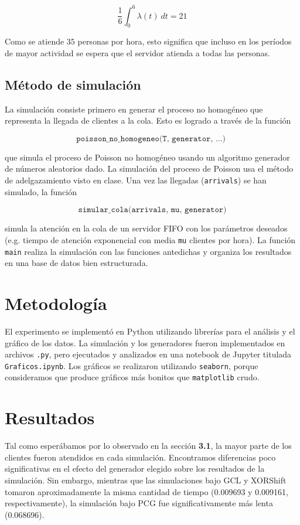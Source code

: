 \documentclass[a4paper, 12pt]{article}
\begin{document}
\begin{equation}
    \frac{1}{6}\int_0^{6}\lambda(t) ~ dt = 21
\end{equation}

Como se atiende $35$ personas por hora, esto significa que incluso en los
períodos de mayor actividad se espera que el servidor atienda a todas las
personas.

\subsection{Método de simulación}

La simulación consiste primero en generar el proceso no homogéneo que representa
la llegada de clientes a la cola. Esto es logrado a través de la función 

\begin{equation*}
    \texttt{poisson\_no\_homogeneo(T, generator, ...) }
\end{equation*}

que simula el proceso de Poisson no homogéneo usando un algoritmo generador de
números aleatorios dado. La simulación del proceso de Poisson usa el método de
adelgazamiento visto en clase. Una vez las llegadas (\texttt{arrivals}) se han simulado, la función

\begin{equation*}
\texttt{simular\_cola(arrivals, mu, generator)}
\end{equation*}

simula la atención en la cola de un servidor FIFO con los parámetros deseados
(e.g. tiempo de atención exponencial con media \texttt{mu} clientes por hora). La función \texttt{main}
realiza la simulación con las funciones antedichas y organiza los resultados en
una base de datos bien estructurada.


\section{Metodología}

El experimento se implementó en Python utilizando librerías para el análisis y
el gráfico de los datos. La simulación y los generadores fueron implementados en
archivos \texttt{.py}, pero ejecutados y analizados en una notebook de Jupyter
titulada \texttt{Graficos.ipynb}. Los gráficos se realizaron utilizando
\texttt{seaborn}, porque consideramos que produce gráficos más bonitos que
\texttt{matplotlib} crudo. 

\section{Resultados}

Tal como esperábamos por lo observado en la sección \textbf{3.1}, la mayor parte
de los clientes fueron atendidos en cada simulación. Encontramos diferencias
poco significativas en el efecto del generador elegido sobre los resultados de
la simulación. Sin embargo, mientras que las simulaciones bajo GCL y XORShift
tomaron aproximadamente la misma cantidad de tiempo (0.009693 y 0.009161,
respectivamente), la simulación bajo PCG fue significativamente más lenta 
(0.068696).
\end{document}
